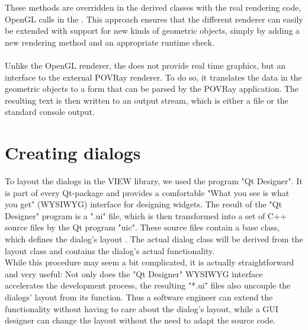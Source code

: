These methods are overridden in the derived classes with the real rendering
code, \eg OpenGL calls in the . 
This approach ensures that the different renderer can easily be extended with support for 
new kinds of geometric objects, simply by adding a new rendering method and an appropriate 
runtime check.
\\
\\
Unlike the OpenGL renderer, the  does not provide real time graphics,
but an interface to the external POVRay renderer.
To do so, it translates the data in the geometric objects to a form that can be 
parsed by the POVRay application. 
The resulting text is then written to an output stream, which is either a
file or the standard console output.

\section{Creating dialogs}
\label{designer}
To layout the dialogs in the VIEW library, we used the program "Qt Designer".
It is part of every Qt-package and provides a comfortable "What you see is what you get"
(WYSIWYG) interface for designing widgets.
The result of the "Qt Designer" program is a ".ui" file, which is then transformed 
into a set of C++ source files by the Qt program "uic".
These source files contain a base class, which defines the dialog's layout . 
The actual dialog class will be derived from the layout class and contains the dialog's
actual functionality.
\\
While this procedure may seem a bit complicated, it is actually straightforward and 
very useful:
Not only does the "Qt Designer" WYSIWYG interface accelerates the development process, 
the resulting "*.ui" files also uncouple the dialogs' layout from its function. 
Thus a software engineer can extend the functionality without 
having to care about the dialog's layout, while a GUI designer can change the layout
without the need to adapt the source code.

